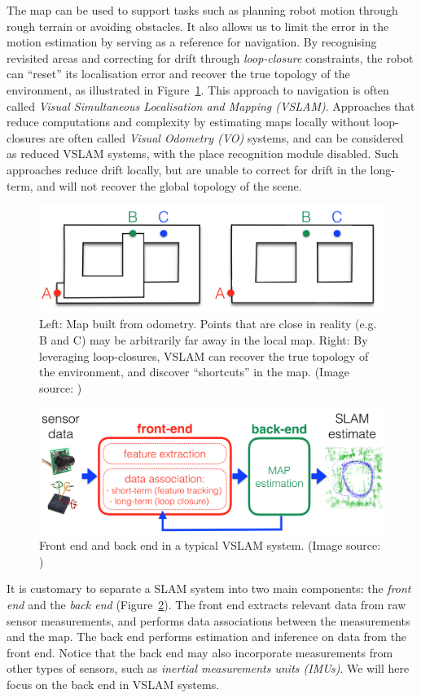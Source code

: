 The map can be used to support tasks such as planning robot motion through rough terrain or avoiding obstacles.
It also allows us to limit the error in the motion estimation by serving as a reference for navigation.
By recognising revisited areas and correcting for drift through \emph{loop-closure} constraints, the robot can ``reset'' its localisation error and recover the true topology of the environment, as illustrated in Figure~\ref{fig:topology}.
This approach to navigation is often called \emph{Visual Simultaneous Localisation and Mapping (VSLAM)}.
Approaches that reduce computations and complexity by estimating maps locally without loop-closures are often called \emph{Visual Odometry (VO)} systems, and can be considered as reduced VSLAM systems, with the place recognition module disabled.
Such approaches reduce drift locally, but are unable to correct for drift in the long-term, and will not recover the global topology of the scene.
\begin{figure}[htb]
    \centering
    \includegraphics[width=0.75\columnwidth]{figures/topology.png}
    \caption{
    Left: Map built from odometry.
    Points that are close in reality (e.g. B and C) may be arbitrarily far away in the local map.
    Right: By leveraging loop-closures, VSLAM can recover the true topology of the environment, and discover ``shortcuts'' in the map.
    (Image source: \cite{Cadena2016})
    }
    \label{fig:topology}
\end{figure}

\begin{figure}[htb]
    \centering
    \includegraphics[width=0.75\columnwidth]{figures/frontBack.png}
    \caption{
    Front end and back end in a typical VSLAM system.
    (Image source: \cite{Cadena2016})
    }
    \label{fig:front-and-backend}
\end{figure}
It is customary to separate a SLAM system into two main components: the \emph{front end} and the \emph{back end} \cite{Cadena2016} (Figure~\ref{fig:front-and-backend}).
The front end extracts relevant data from raw sensor measurements, and performs data associations between the measurements and the map.
The back end performs estimation and inference on data from the front end.
Notice that the back end may also incorporate measurements from other types of sensors, such as \emph{inertial measurements units (IMUs)}.
We will here focus on the back end in VSLAM systems.

